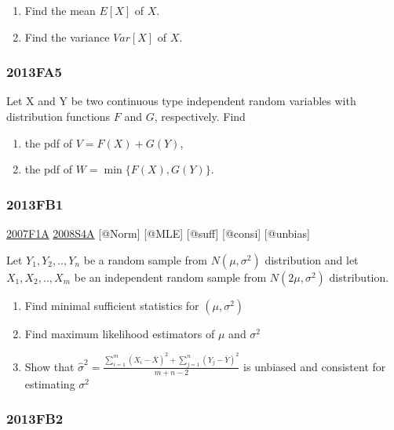\documentclass[6pt,twocolumn,Portrait]{article}
\begin{document}
\begin{enumerate}
\def\labelenumi{(\alph{enumi})}
\item
  Find the mean \(E[X]\) of \(X\).
\item
  Find the variance \(Var[X]\) of \(X\).
\end{enumerate}

\hypertarget{fa5}{%
\subsubsection{2013FA5}\label{fa5}}

Let X and Y be two continuous type independent random variables with
distribution functions \(F\) and \(G\), respectively. Find

\begin{enumerate}
\def\labelenumi{(\alph{enumi})}
\item
  the pdf of \(V=F(X)+G(Y)\),
\item
  the pdf of \(W=\min\{F(X),G(Y)\}\).
\end{enumerate}

\hypertarget{fb1-2}{%
\subsubsection{2013FB1}\label{fb1-2}}

\protect\hyperlink{f1a}{2007F1A} \protect\hyperlink{s4a}{2008S4A}
{[}@Norm{]} {[}@MLE{]} {[}@suff{]} {[}@consi{]} {[}@unbias{]}

Let \(Y_1,Y_2,..,Y_{n}\) be a random sample from \(N(\mu,\sigma^2)\)
distribution and let \(X_1,X_2,..,X_{m}\) be an independent random
sample from \(N(2\mu,\sigma^2)\) distribution.

\begin{enumerate}
\def\labelenumi{(\alph{enumi})}
\item
  Find minimal sufficient statistics for \((\mu,\sigma^2)\)
\item
  Find maximum likelihood estimators of \(\mu\) and \(\sigma^2\)
\item
  Show that
  \(\hat\sigma^2=\frac{\sum_{i=1}^m(X_i-\bar X)^2+\sum_{j=1}^n(Y_j-\bar Y)^2}{m+n-2}\)
  is unbiased and consistent for estimating \(\sigma^2\)
\end{enumerate}

\hypertarget{fb2-2}{%
\subsubsection{2013FB2}\label{fb2-2}}
\end{document}
